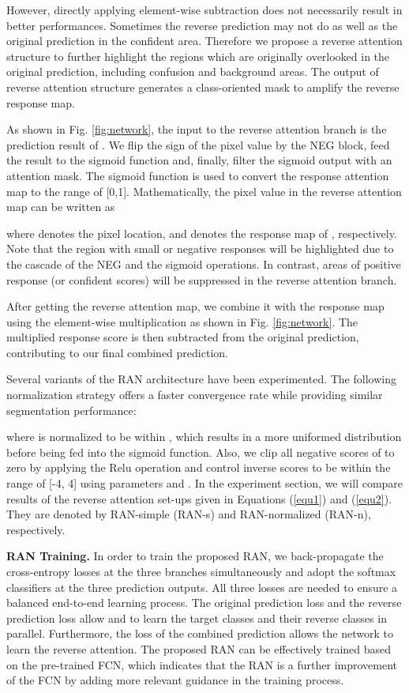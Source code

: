 \documentclass[runningheads]{llncs}
\begin{document}
However, directly applying element-wise subtraction does not necessarily result in better performances.
Sometimes the reverse prediction may not do as well as the original prediction in the confident area.
Therefore we propose a reverse attention structure to further highlight the regions which are originally
overlooked in the original prediction, including confusion and background areas. The output of reverse attention structure generates a 
class-oriented mask to amplify the reverse response map. 

As shown in Fig. \ref{fig:network}, the input to the reverse attention branch is the
prediction result of . We flip the sign of the pixel value by
the NEG block, feed the result to the sigmoid function and, finally,
filter the sigmoid output with an attention mask. The sigmoid function
is used to convert the response attention map to the range of [0,1].
Mathematically, the pixel value in the reverse attention map  can be
written as

where  denotes the pixel location, and  
denotes the response map of , respectively. Note that the region with small or negative responses
 will be highlighted due to the cascade of the NEG and
the sigmoid operations. In contrast, areas of positive response (or
confident scores) will be suppressed in the reverse attention branch.



After getting the reverse attention map, we combine it with the
 response map using the element-wise multiplication as shown in
Fig. \ref{fig:network}. The multiplied response score is then subtracted from the original prediction, contributing to our final combined prediction.

Several variants of the RAN architecture have been experimented. The
following normalization strategy offers a faster convergence rate while
providing similar segmentation performance:

where  is normalized to be within , which
results in a more uniformed distribution before being fed into the
sigmoid function. Also, we clip all negative scores of 
to zero by applying the Relu operation and control inverse scores to be
within the range of [-4, 4] using parameters  and .  In the
experiment section, we will compare results of the reverse attention
set-ups given in Equations (\ref{equ1}) and (\ref{equ2}). They are 
denoted by RAN-simple (RAN-s) and RAN-normalized (RAN-n), respectively.


{\bf RAN Training.} In order to train the proposed RAN, we
back-propagate the cross-entropy losses at the three branches
simultaneously and adopt the softmax classifiers at the three prediction
outputs.  All three losses are needed to ensure a balanced end-to-end
learning process. The original prediction loss and the reverse
prediction loss allow  and  to learn the target classes
and their reverse classes in parallel. Furthermore, the loss of the
combined prediction allows the network to learn the reverse attention.
The proposed RAN can be effectively trained based on the pre-trained
FCN, which indicates that the RAN is a further improvement of the FCN by
adding more relevant guidance in the training process.
\end{document}
